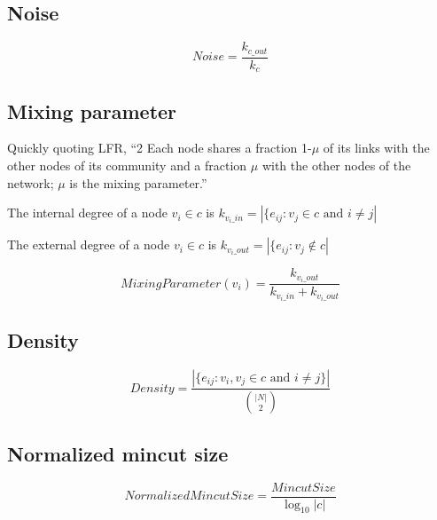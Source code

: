 \documentclass[aps,pre,superscriptaddress]{article}
\begin{document}
\subsection{Noise}

\begin{equation}
	Noise = \frac{k_{c\_out}}{k_{c}}
\end{equation}

\subsection{Mixing parameter}
Quickly quoting LFR, ``2 Each node shares a fraction 1-$\mu$ of its links with the other nodes of its community and a fraction $\mu$ with the other nodes of the network; $\mu$ is the mixing parameter.''

The internal degree of a node $v_{i} \in c$ is $k_{v_{i}\_{in}}=|\{e_{ij} :v_{j} \in c \text{ and } i \neq j|$

The external degree of a node $v_{i} \in c$ is $k_{v_{i}\_{out}}=|\{e_{ij} :v_{j} \notin c |$

\begin{equation}
	MixingParameter(v_{i}) = \frac{k_{v_{i}\_out}}{k_{v_{i}\_in} + k_{v_{i}\_out}}
\end{equation}

\subsection{Density}
\begin{equation}
	Density=\frac{|\{e_{ij} : v_{i},v_{j} \in c \text{ and } i \neq j\}|}{{\binom{|N|}{2}}}
\end{equation}

\subsection{Normalized mincut size}
\begin{equation}
	NormalizedMincutSize=\frac{MincutSize}{\log_{10}{|c|}}
\end{equation}

\end{document}

